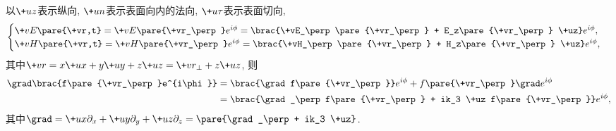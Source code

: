 \documentclass[hidelinks]{ctexart}
\begin{document}
以$\+uz$表示纵向, $\+un$表示表面向内的法向, $\+u\tau$表示表面切向,
\[ \begin{cases}
    \+vE\pare{\+vr,t} = \+vE\pare{\+vr_\perp} e^{i\phi} = \brac{\+vE_\perp\pare{\+vr_\perp} + E_z\pare{\+vr_\perp} \+uz} e^{i\phi}, \\
    \+vH\pare{\+vr,t} = \+vH\pare{\+vr_\perp} e^{i\phi} = \brac{\+vH_\perp\pare{\+vr_\perp} + H_z\pare{\+vr_\perp} \+uz} e^{i\phi},
\end{cases} \]
其中$\+vr = x\+ux + y\+uy + z\+uz = \+vr_\perp + z\+uz$, 则
\begin{align*}
    \grad\brac{f\pare{\+vr_\perp}e^{i\phi}} &= \brac{\grad f\pare{\+vr_\perp}}e^{i\phi} + f\pare{\+vr_\perp}\grad e^{i\phi} \\
    &= \brac{\grad_\perp f\pare{\+vr_\perp} + ik_3 \+uz f\pare{\+vr_\perp}} e^{i\phi},
\end{align*}
其中$\grad = \+ux\partial_x + \+uy\partial_y + \+uz\partial_z = \pare{\grad_\perp + ik_3 \+uz}$.
\end{document}
